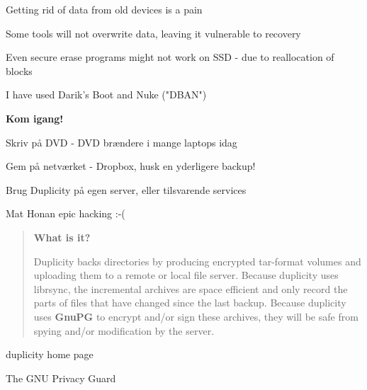 \documentclass[20pt,landscape,a4paper,footrule]{foils}
\begin{document}


\begin{list1}
\item Getting rid of data from old devices is a pain
\item Some tools will not overwrite data, leaving it vulnerable to recovery
\item Even secure erase programs might not work on SSD - due to reallocation of blocks
\item I have used Darik's Boot and Nuke ("DBAN") 
\end{list1}






\vskip 3cm
\centerline{\LARGE \bf Kom igang!}

\begin{list2}
\item Skriv på DVD - DVD brændere i mange laptops idag
\item Gem på netværket - Dropbox, husk en yderligere backup!
\item Brug Duplicity på egen server, eller tilsvarende services
\end{list2}

Mat Honan epic hacking :-(\\ {\small{}}


\begin{quote}
{\large\bf What is it?}

Duplicity backs directories by producing encrypted tar-format volumes and uploading them to a remote or local file server. Because duplicity uses librsync, the incremental archives are space efficient and only record the parts of files that have changed since the last backup. Because duplicity uses {\bf GnuPG} to encrypt and/or sign these archives, they will be safe from spying and/or modification by the server.
\end{quote}

 duplicity home page

 The GNU Privacy Guard



\end{document}
